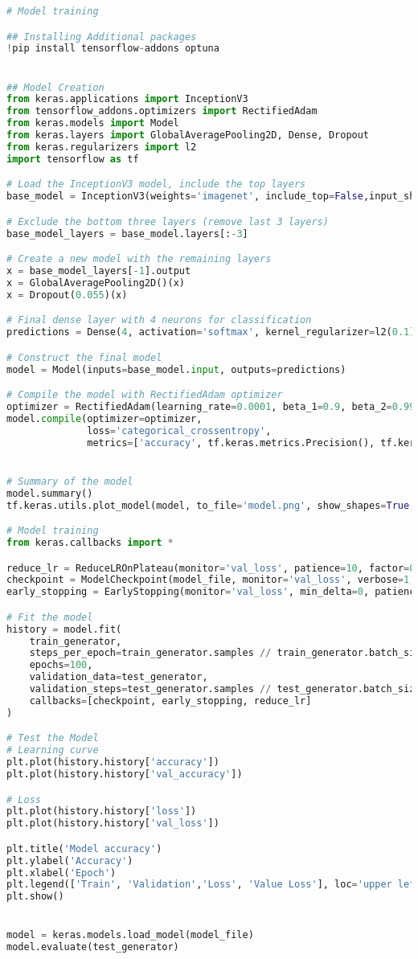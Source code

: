 \begin{lstlisting}[language=Python]
# Model training

## Installing Additional packages
!pip install tensorflow-addons optuna


## Model Creation
from keras.applications import InceptionV3
from tensorflow_addons.optimizers import RectifiedAdam
from keras.models import Model
from keras.layers import GlobalAveragePooling2D, Dense, Dropout
from keras.regularizers import l2
import tensorflow as tf

# Load the InceptionV3 model, include the top layers
base_model = InceptionV3(weights='imagenet', include_top=False,input_shape=(224,224,3))

# Exclude the bottom three layers (remove last 3 layers)
base_model_layers = base_model.layers[:-3]

# Create a new model with the remaining layers
x = base_model_layers[-1].output
x = GlobalAveragePooling2D()(x)
x = Dropout(0.055)(x)

# Final dense layer with 4 neurons for classification
predictions = Dense(4, activation='softmax', kernel_regularizer=l2(0.1), dtype='float64')(x)

# Construct the final model
model = Model(inputs=base_model.input, outputs=predictions)

# Compile the model with RectifiedAdam optimizer
optimizer = RectifiedAdam(learning_rate=0.0001, beta_1=0.9, beta_2=0.999, epsilon=1e-08)
model.compile(optimizer=optimizer,
              loss='categorical_crossentropy',
              metrics=['accuracy', tf.keras.metrics.Precision(), tf.keras.metrics.Recall(), 'categorical_accuracy'])


# Summary of the model
model.summary()
tf.keras.utils.plot_model(model, to_file='model.png', show_shapes=True, show_layer_names=True)

# Model training
from keras.callbacks import *

reduce_lr = ReduceLROnPlateau(monitor='val_loss', patience=10, factor=0.3, min_lr=1e-6)
checkpoint = ModelCheckpoint(model_file, monitor='val_loss', verbose=1, save_best_only=True)
early_stopping = EarlyStopping(monitor='val_loss', min_delta=0, patience=20, verbose=1, mode='auto')

# Fit the model
history = model.fit(
    train_generator,
    steps_per_epoch=train_generator.samples // train_generator.batch_size,
    epochs=100,
    validation_data=test_generator,
    validation_steps=test_generator.samples // test_generator.batch_size,
    callbacks=[checkpoint, early_stopping, reduce_lr]
)

# Test the Model
# Learning curve
plt.plot(history.history['accuracy'])
plt.plot(history.history['val_accuracy'])

# Loss
plt.plot(history.history['loss'])
plt.plot(history.history['val_loss'])

plt.title('Model accuracy')
plt.ylabel('Accuracy')
plt.xlabel('Epoch')
plt.legend(['Train', 'Validation','Loss', 'Value Loss'], loc='upper left')
plt.show()


model = keras.models.load_model(model_file)
model.evaluate(test_generator)

\end{lstlisting}
